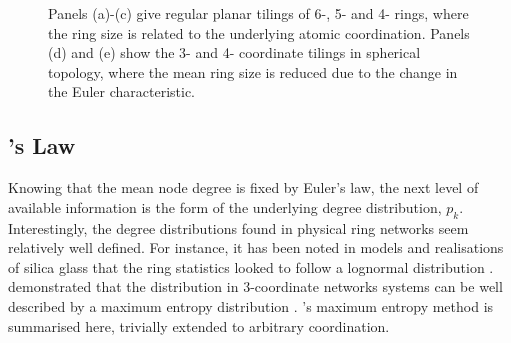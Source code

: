 \begin{figure}[h]
     \caption{Panels (a)\--(c) give regular planar tilings of 6\--, 5\-- and 4\-- rings, where the ring size is related to the underlying atomic coordination. Panels (d) and (e) show the 3\-- and 4\-- coordinate tilings in spherical topology, where the mean ring size is reduced due to the change in the Euler characteristic.}
     \label{fig:lattices}
\end{figure}

\subsection{\lm's Law}
\label{s:lemaitre}

Knowing that the mean node degree is fixed by Euler's law, the next level of available information is the form of the underlying degree distribution, $p_k$.
Interestingly, the degree distributions found in physical ring networks seem relatively well defined.
For instance, it has been noted in models and realisations of \td{} silica glass that the ring statistics looked to follow a lognormal distribution \cite{Shackelford1981,Buchner2017}.
\lm{} \etal{} demonstrated that the distribution in 3-coordinate networks systems can be well described by a maximum entropy distribution \cite{Gervois1992}.
\lm's{} maximum entropy method is summarised here, trivially extended to arbitrary coordination.

